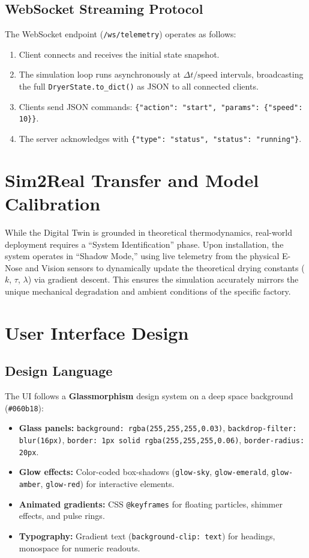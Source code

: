 ﻿\documentclass[12pt, a4paper]{report}
\begin{document}
\subsection{WebSocket Streaming Protocol}
The WebSocket endpoint (\texttt{/ws/telemetry}) operates as follows:
\begin{enumerate}
    \item Client connects and receives the initial state snapshot.
    \item The simulation loop runs asynchronously at $\Delta t / \text{speed}$ intervals, broadcasting the full \texttt{DryerState.to\_dict()} as JSON to all connected clients.
    \item Clients send JSON commands: \texttt{\{"action": "start", "params": \{"speed": 10\}\}}.
    \item The server acknowledges with \texttt{\{"type": "status", "status": "running"\}}.
\end{enumerate}

\section{Sim2Real Transfer and Model Calibration}
While the Digital Twin is grounded in theoretical thermodynamics, real-world deployment requires a ``System Identification'' phase. Upon installation, the system operates in ``Shadow Mode,'' using live telemetry from the physical E-Nose and Vision sensors to dynamically update the theoretical drying constants ($k$, $\tau$, $\lambda$) via gradient descent. This ensures the simulation accurately mirrors the unique mechanical degradation and ambient conditions of the specific factory.

\section{User Interface Design}

\subsection{Design Language}
The UI follows a \textbf{Glassmorphism} design system on a deep space background (\texttt{\#060b18}):
\begin{itemize}
    \item \textbf{Glass panels:} \texttt{background: rgba(255,255,255,0.03)}, \texttt{backdrop-filter: blur(16px)}, \texttt{border: 1px solid rgba(255,255,255,0.06)}, \texttt{border-radius: 20px}.
    \item \textbf{Glow effects:} Color-coded box-shadows (\texttt{glow-sky}, \texttt{glow-emerald}, \texttt{glow-amber}, \texttt{glow-red}) for interactive elements.
    \item \textbf{Animated gradients:} CSS \texttt{@keyframes} for floating particles, shimmer effects, and pulse rings.
    \item \textbf{Typography:} Gradient text (\texttt{background-clip: text}) for headings, monospace for numeric readouts.
\end{itemize}
\end{document}
